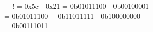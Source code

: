\documentclass{article}
\begin{document}
\noindent \ - ! = 0x5c - 0x21 = 0b01011100 - 0b00100001\\
= 0b01011100 + 0b11011111 - 0b100000000\\
= 0b00111011
\end{document}

